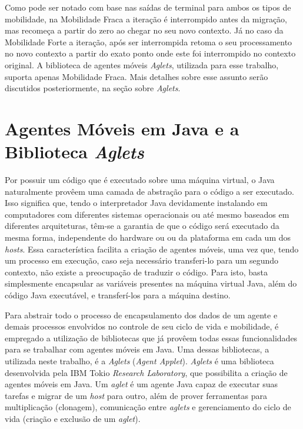 	Como pode ser notado com base nas saídas de terminal para ambos os tipos de mobilidade, na Mobilidade Fraca a iteração é interrompido antes da migração, mas recomeça a partir do zero ao chegar no seu novo contexto. Já no caso da Mobilidade Forte a iteração, após ser interrompida retoma o seu processamento no novo contexto a partir do exato ponto onde este foi interrompido no contexto original. A biblioteca de agentes móveis \textit{Aglets}, utilizada para esse trabalho, suporta apenas Mobilidade Fraca. Mais detalhes sobre esse assunto serão discutidos posteriormente, na seção sobre \textit{Aglets}.


\section{Agentes Móveis em Java e a Biblioteca \textit{Aglets}}

	Por possuir um código que é executado sobre uma máquina virtual, o Java naturalmente provêem uma camada de abstração para o código a ser executado. Isso significa que, tendo o interpretador Java devidamente instalando em computadores com diferentes sistemas operacionais ou até mesmo baseados em diferentes arquiteturas, têm-se a garantia de que o código será executado da mesma forma, independente do hardware ou ou da plataforma em cada um dos \textit{hosts}. Essa característica facilita a criação de agentes móveis, uma vez que, tendo um processo em execução, caso seja necessário transferi-lo para um segundo contexto, não existe a preocupação de traduzir o código. Para isto, basta simplesmente encapsular as variáveis presentes na máquina virtual Java, além do código Java executável, e transferí-los para a máquina destino.
	
	Para abstrair todo o processo de encapsulamento dos dados de um agente e demais processos envolvidos no controle de seu ciclo de vida e mobilidade, é empregado a utilização de bibliotecas que já provêem todas essas funcionalidades para se trabalhar com agentes móveis em Java. Uma dessas bibliotecas, a utilizada neste trabalho, é a \textit{Aglets} (\textit{Agent Applet}). \textit{Aglets} é uma biblioteca desenvolvida pela IBM Tokio \textit{Research Laboratory}, que possibilita a criação de agentes móveis em Java. Um \textit{aglet} é um agente Java capaz de executar suas tarefas e migrar de um \textit{host} para outro, além de prover ferramentas para multiplicação (clonagem), comunicação entre \textit{aglets} e gerenciamento do ciclo de vida (criação e exclusão de um \textit{aglet}). 
	
